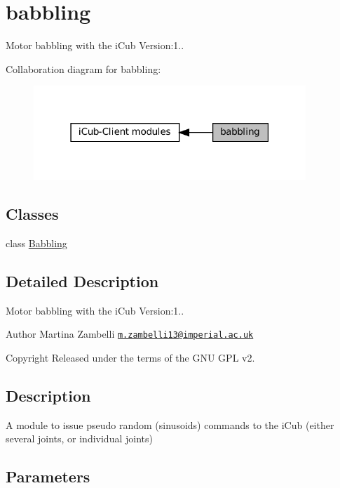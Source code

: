 \hypertarget{group__babbling}{}\section{babbling}
\label{group__babbling}


Motor babbling with the i\+Cub Version\+:1..  


Collaboration diagram for babbling\+:
\nopagebreak
\begin{figure}[H]
\begin{center}
\leavevmode
\includegraphics[width=291pt]{group__babbling}
\end{center}
\end{figure}
\subsection*{Classes}
\begin{DoxyCompactItemize}
\item 
class \hyperlink{group__babbling_classBabbling}{Babbling}
\end{DoxyCompactItemize}


\subsection{Detailed Description}
Motor babbling with the i\+Cub Version\+:1.. 

\begin{DoxyAuthor}{Author}
Martina Zambelli \href{mailto:m.zambelli13@imperial.ac.uk}{\tt m.\+zambelli13@imperial.\+ac.\+uk} ~\newline
 
\end{DoxyAuthor}
\begin{DoxyCopyright}{Copyright}
Released under the terms of the G\+NU G\+PL v2. 
\end{DoxyCopyright}
\hypertarget{group__touchDetector_intro_sec}{}\subsection{Description}\label{group__touchDetector_intro_sec}
A module to issue pseudo random (sinusoids) commands to the i\+Cub (either several joints, or individual joints)\hypertarget{group__touchDetector_parameters_sec}{}\subsection{Parameters}\label{group__touchDetector_parameters_sec}

